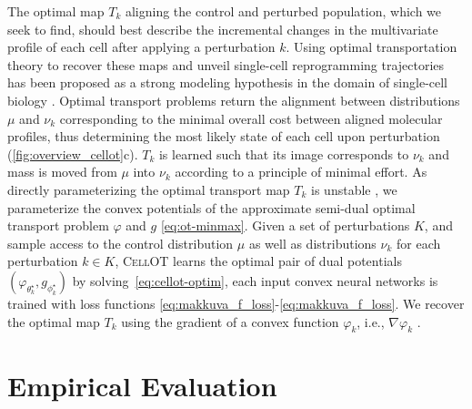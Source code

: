  The optimal map $T_k$ aligning the control and perturbed population, which we seek to find, should best describe the incremental changes in the multivariate profile of each cell after applying a perturbation $k$. Using optimal transportation theory \citep{villani2021topics, santambrogio2015optimal} to recover these maps and unveil single-cell reprogramming trajectories has been proposed as a strong modeling hypothesis in the domain of single-cell biology \citep{schiebinger2019optimal, cang2020inferring, demetci2022scot, huizing2022optimal, lavenant2021towards, zhang2021optimal}.
Optimal transport problems return the alignment between distributions $\mu$ and $\nu_k$ corresponding to the minimal overall cost between aligned molecular profiles, thus determining the most likely state of each cell upon perturbation (\cref{fig:overview_cellot}c).
$T_k$ is learned such that its image corresponds to $\nu_k$ and mass is moved from $\mu$ into $\nu_k$ according to a principle of minimal effort.
As directly parameterizing the optimal transport map $T_k$ \citep{korotin2021wasserstein, yang2018scalable, prasad2020optimal} is unstable \citep[Table 1]{makkuva2020optimal}, we parameterize the convex potentials of the approximate semi-dual optimal transport problem $\varphi$ and $g$ \eqref{eq:ot-minmax}.
Given a set of perturbations $K$, and sample access to the control distribution $\mu$ as well as  distributions $\nu_k$ for each perturbation $k \in K$, \textsc{CellOT} learns the optimal pair of dual potentials $(\varphi_{\theta_k^\star}, g_{\phi_k^\star})$ by solving~\eqref{eq:cellot-optim}, each input convex neural networks \citep{amos2017input} is trained with loss functions \eqref{eq:makkuva_f_loss}-\eqref{eq:makkuva_f_loss}. We recover the optimal map $T_k$ using the gradient of a convex function $\varphi_k$, i.e., $\nabla \varphi_k$ \citep{makkuva2020optimal}.

\section{Empirical Evaluation}

